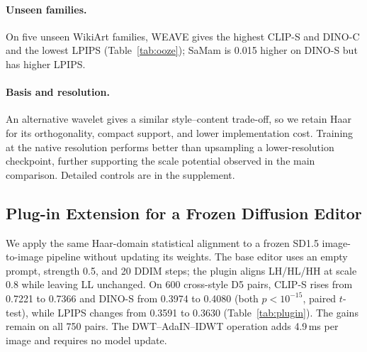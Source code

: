 \documentclass[letterpaper]{article}
\begin{document}
\paragraph{Unseen families.}
On five unseen WikiArt families, WEAVE gives the highest CLIP-S and DINO-C and the lowest
LPIPS (Table~\ref{tab:ooze}); SaMam is 0.015 higher on DINO-S but has higher LPIPS.
\begin{table}[ht]
\centering
\small
{}
\caption{Zero-shot transfer to five held-out WikiArt style families (Other5; 750 pairs) using the D5 checkpoint.}
\label{tab:ooze}
\end{table}

\paragraph{Basis and resolution.}
An alternative wavelet gives a similar style--content trade-off, so we retain Haar for its
orthogonality, compact support, and lower implementation cost. Training at the native
resolution performs better than upsampling a lower-resolution checkpoint, further supporting
the scale potential observed in the main comparison. Detailed controls are in the supplement.


\subsection{Plug-in Extension for a Frozen Diffusion Editor}
\label{sec:plugin}

We apply the same Haar-domain statistical alignment to a frozen SD1.5 image-to-image
pipeline without updating its weights. The base editor uses an empty prompt, strength 0.5, and 20 DDIM
steps; the plugin aligns LH/HL/HH at scale 0.8 while leaving LL unchanged. On 600
cross-style D5 pairs, CLIP-S rises from 0.7221 to 0.7366 and DINO-S from 0.3974 to 0.4080
(both $p{<}10^{-15}$, paired $t$-test), while LPIPS changes from 0.3591 to 0.3630
(Table~\ref{tab:plugin}). The gains remain on all 750 pairs. The DWT--AdaIN--IDWT operation
adds 4.9\,ms per image and requires no model update.
\end{document}
